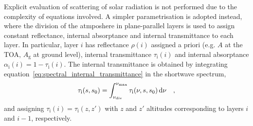 \documentclass[a4paper,10pt,twocolumn,\classoptions]{article}
\begin{document}
Explicit evaluation of scattering of solar radiation is not performed due to the complexity of equations involved. A simpler parametrisation is adopted instead, where the division of the atmposhere in plane-parallel layers is used to assign constant reflectance, internal absorptance and internal transmittance to each layer.
In particular, layer $i$ has reflectance $\rho(i)$ assigned a priori (e.g. $A$ at the TOA, $A_\text{g}$ at ground level), internal transmittance $\tau_\text{i}(i)$ and internal absorptance $\alpha_\text{i}(i) = 1 - \tau_\text{i}(i)$. The internal transmittance is obtained by integrating equation~\ref{eq:spectral_internal_transmittance} in the shortwave spectrum,
\begin{equation}
  \label{eq:internal_transmittance}
  \tau_\text{i}(s, s_0) = \int_{\nu_\text{div}}^{\nu_\text{max}} \tau_\text{i}(\nu, s, s_0) \odif{\nu}
  \quad ,
\end{equation}
and assigning $\tau_\text{i}(i) = \tau_\text{i}(z, z')$ with $z$ and $z'$ altitudes corresponding to layers $i$ and $i - 1$, respectively.

\end{document}
